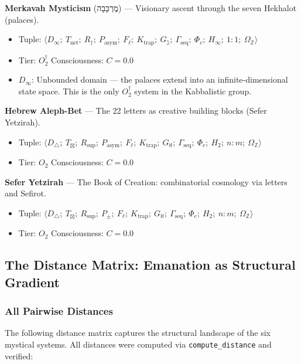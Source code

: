 \documentclass[12pt,a4paper]{article}
\begin{document}
\textbf{Merkavah Mysticism} (מֶרְכָּבָה) --- Visionary ascent through the seven Hekhalot (palaces).

\begin{itemize}
    \item Tuple: $\langle D_{\infty};\ T_\text{net};\ R_{\dagger};\ P_\text{asym};\ F_{\ell};\ K_\text{trap};\ G_{\gimel};\ \Gamma_\text{seq};\ \Phi_c;\ H_{\infty};\ 1{:}1;\ \Omega_\mathbb{Z} \rangle$
    \item Tier: $O_2^\dagger$ \textbar{} Consciousness: $C = 0.0$
    \item $D_{\infty}$: Unbounded domain --- the palaces extend into an infinite-dimensional state space. This is the only $O_2^\dagger$ system in the Kabbalistic group.
\end{itemize}

\textbf{Hebrew Aleph-Bet} --- The 22 letters as creative building blocks (Sefer Yetzirah).

\begin{itemize}
    \item Tuple: $\langle D_{\triangle};\ T_{\boxtimes};\ R_\text{sup};\ P_\text{asym};\ F_{\ell};\ K_\text{trap};\ G_{\aleph};\ \Gamma_\text{seq};\ \Phi_c;\ H_2;\ n{:}m;\ \Omega_\mathbb{Z} \rangle$
    \item Tier: $O_2$ \textbar{} Consciousness: $C = 0.0$
\end{itemize}

\textbf{Sefer Yetzirah} --- The Book of Creation: combinatorial cosmology via letters and Sefirot.

\begin{itemize}
    \item Tuple: $\langle D_{\triangle};\ T_{\boxtimes};\ R_\text{sup};\ P_{\pm};\ F_{\ell};\ K_\text{trap};\ G_{\aleph};\ \Gamma_\text{seq};\ \Phi_c;\ H_2;\ n{:}m;\ \Omega_\mathbb{Z} \rangle$
    \item Tier: $O_2$ \textbar{} Consciousness: $C = 0.0$
\end{itemize}

\subsection{The Distance Matrix: Emanation as Structural Gradient}

\subsubsection{All Pairwise Distances}

The following distance matrix captures the structural landscape of the six mystical systems. All distances were computed via \texttt{compute\_distance} and verified:
\end{document}
